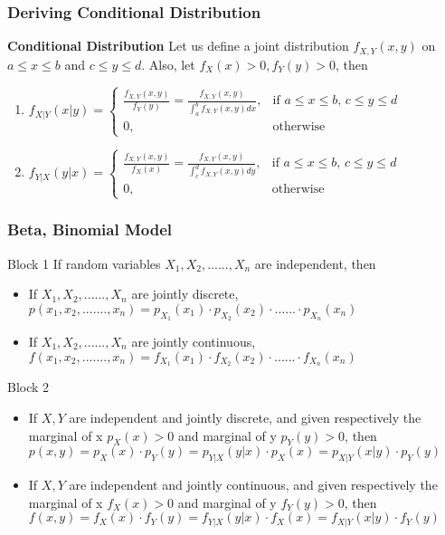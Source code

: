 \documentclass{beamer}
\begin{document}


\begin{frame}
\frametitle{Deriving Conditional Distribution}
\textbf{Conditional Distribution}
Let us define a joint distribution $f_{X,Y}(x,y)$ on $a\le x \le b$ and $c\le y \le d$. Also, let $f_X(x)>0, f_Y(y) >0$, then
\begin{enumerate}
\item $f_{X|Y}(x|y) =\begin{cases}
			\frac{f_{X,Y}(x,y)}{f_Y(y)} = \frac{f_{X,Y}(x,y)}{\int_a^b f_{X,Y}(x,y)dx}, & \text{if $a\le x \le b$, $c\le y \le d$}\\
            0, & \text{otherwise}
		 \end{cases}$
\item $f_{Y|X}(y|x) =\begin{cases}
			\frac{f_{X,Y}(x,y)}{f_X(x)} = \frac{f_{X,Y}(x,y)}{\int_c^d f_{X,Y}(x,y)dy}, & \text{if $a\le x \le b$, $c\le y \le d$}\\
            0, & \text{otherwise}
		 \end{cases}$

\end{enumerate}
\end{frame}



\begin{frame}
\frametitle{Beta, Binomial Model}
\begin{block}{Block 1}
If random variables $X_1, X_2, ...... , X_n$ are independent, then
\begin{itemize}
\item If $X_1, X_2, ......, X_n$ are jointly discrete, $p(x_1, x_2, ......., x_n) = p_{X_1}(x_1) \cdot p_{X_2}(x_2) \cdot ...... \cdot p_{X_n}(x_n)$
\item If $X_1, X_2, ......, X_n$ are jointly continuous, $f(x_1, x_2, ......., x_n) = f_{X_1}(x_1) \cdot f_{X_2}(x_2) \cdot ...... \cdot f_{X_n}(x_n)$
\end{itemize}
\end{block}

\begin{block}{Block 2}
\begin{itemize}
\item If $X,Y$ are independent and jointly discrete, and given respectively the marginal of x $p_X(x)>0$ and marginal of y $p_Y(y)>0$, then $p(x,y) = p_{X}(x) \cdot p_{Y}(y) = p_{Y|X}(y|x) \cdot p_{X}(x) = p_{X|Y}(x|y) \cdot p_{Y}(y)$
\item If $X,Y$ are independent and jointly continuous, and given respectively the marginal of x $f_X(x)>0$ and marginal of y $f_Y(y)>0$, then $f(x,y) = f_{X}(x) \cdot f_{Y}(y) = f_{Y|X}(y|x) \cdot f_{X}(x) = f_{X|Y}(x|y) \cdot f_{Y}(y)$
\end{itemize}
\end{block}


\end{frame}
\end{document}
